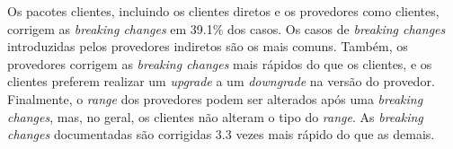 \begin{mdframed}
Os pacotes clientes, incluindo os clientes diretos e os provedores como clientes, corrigem as \textit{breaking changes} em 39.1\% dos casos. Os casos de \textit{breaking changes} introduzidas pelos provedores indiretos são os mais comuns. Também, os provedores corrigem as \textit{breaking changes} mais rápidos do que os clientes, e os clientes preferem realizar um \textit{upgrade} a um \textit{downgrade} na versão do provedor. Finalmente, o \textit{range} dos provedores podem ser alterados após uma \textit{breaking changes}, mas, no geral, os clientes não alteram o tipo do \textit{range}. As \textit{breaking changes} documentadas são corrigidas 3.3 vezes mais rápido do que as demais.
\end{mdframed}